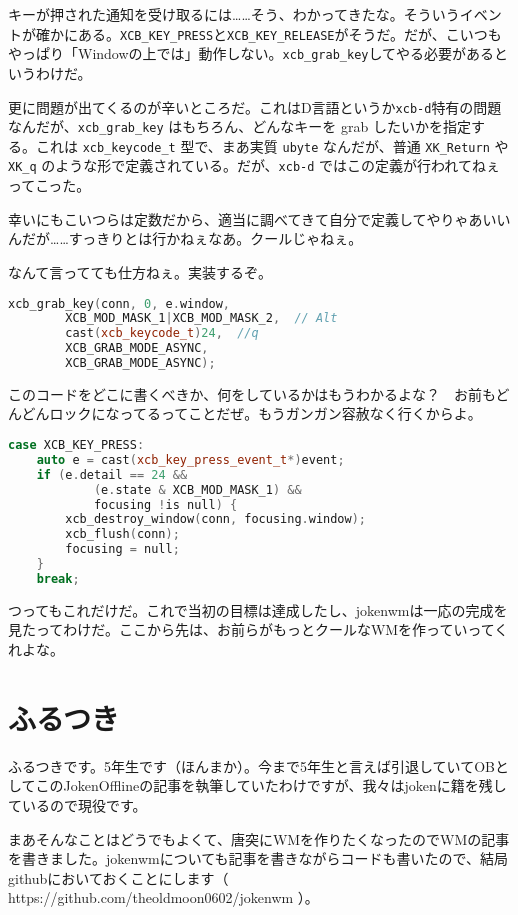 \documentclass[12pt,a4paper]{jsarticle}
\begin{document}
キーが押された通知を受け取るには……そう、わかってきたな。そういうイベントが確かにある。\lstinline{XCB_KEY_PRESS}と\lstinline{XCB_KEY_RELEASE}がそうだ。だが、こいつもやっぱり「Windowの上では」動作しない。\lstinline{xcb_grab_key}してやる必要があるというわけだ。

更に問題が出てくるのが辛いところだ。これはD言語というか\lstinline{xcb-d}特有の問題なんだが、\lstinline{xcb_grab_key} はもちろん、どんなキーを grab したいかを指定する。これは \lstinline{xcb_keycode_t} 型で、まあ実質 \lstinline{ubyte} なんだが、普通 \lstinline{XK_Return} や \lstinline{XK_q} のような形で定義されている。だが、\lstinline{xcb-d} ではこの定義が行われてねぇってこった。

幸いにもこいつらは定数だから、適当に調べてきて自分で定義してやりゃあいいんだが……すっきりとは行かねぇなあ。クールじゃねぇ。

なんて言ってても仕方ねぇ。実装するぞ。

\begin{lstlisting}[language=C++]
xcb_grab_key(conn, 0, e.window,
		XCB_MOD_MASK_1|XCB_MOD_MASK_2,  // Alt
		cast(xcb_keycode_t)24,  //q
		XCB_GRAB_MODE_ASYNC,
		XCB_GRAB_MODE_ASYNC);
\end{lstlisting}


このコードをどこに書くべきか、何をしているかはもうわかるよな？　お前もどんどんロックになってるってことだぜ。もうガンガン容赦なく行くからよ。

\begin{lstlisting}[language=C++]
case XCB_KEY_PRESS:
	auto e = cast(xcb_key_press_event_t*)event;
	if (e.detail == 24 &&
			(e.state & XCB_MOD_MASK_1) &&
			focusing !is null) {
		xcb_destroy_window(conn, focusing.window);
		xcb_flush(conn);
		focusing = null;
	}
	break;
\end{lstlisting}

つってもこれだけだ。これで当初の目標は達成したし、jokenwmは一応の完成を見たってわけだ。ここから先は、お前らがもっとクールなWMを作っていってくれよな。

\section{ふるつき}

ふるつきです。5年生です（ほんまか）。今まで5年生と言えば引退していてOBとしてこのJokenOfflineの記事を執筆していたわけですが、我々はjokenに籍を残しているので現役です。

まあそんなことはどうでもよくて、唐突にWMを作りたくなったのでWMの記事を書きました。jokenwmについても記事を書きながらコードも書いたので、結局githubにおいておくことにします（ https://github.com/theoldmoon0602/jokenwm ）。
\end{document}
